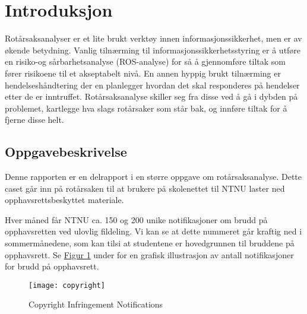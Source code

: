 \chapter{Introduksjon}
Rotårsaksanalyser er et lite brukt verktøy innen informasjonssikkerhet, men er av økende betydning. Vanlig tilnærming til informasjonssikkerhetsstyring er å utføre en risiko-og sårbarhetsanalyse (ROS-analyse) for så å gjennomføre tiltak som fører risikoene til et akseptabelt nivå. En annen hyppig brukt tilnærming er hendelseshåndtering der en planlegger hvordan det skal responderes på hendelser etter de er inntruffet. Rotårsaksanalyse skiller seg fra disse ved å gå i dybden på problemet, kartlegge hva slags rotårsaker som står bak, og innføre tiltak for å fjerne disse helt.

\section{Oppgavebeskrivelse}
Denne rapporten er en delrapport i en større oppgave om rotårsaksanalyse. Dette caset går inn på rotårsaken til at brukere på skolenettet til NTNU laster ned opphavsrettsbeskyttet materiale.

Hver måned får NTNU ca. 150 og 200 unike notifikasjoner om brudd på opphavsretten ved ulovlig fildeling. Vi kan se at dette nummeret går kraftig ned i sommermånedene, som kan tilsi at studentene er hovedgrunnen til bruddene på opphavsrett. Se \hyperref[fig:copyright]{Figur 1} under for en grafisk illustrasjon av antall notifikasjoner for brudd på opphavsrett.

\begin{figure}[H]
    \centering
    \texttt{[image: copyright]}
    \label{fig:copyright}
    \caption[Copyright Infringement Notifications]{Copyright Infringement Notifications}
\end{figure}

\begin{comment}
\begin{table} [H]
    \begin{tabular}{ | m{12em} | m{12em} | m{12em} | }
        \hline
            \cellcolor{yellow} & \cellcolor{yellow} Breaches & \cellcolor{yellow} Copyright breach/Piracy\\
        \hline
            Policy Violation & Information Security Policy & 2 \\
        \hline
             & IT Policy & 43 \\
        \hline
    \end{tabular}
    \caption{Oversikt over kvantiteten av brudd på policy}
    \label{kritisk_tabell_1}
\end{table}
\end{comment}

